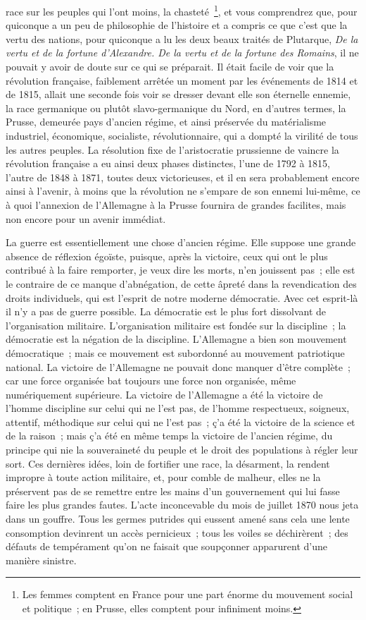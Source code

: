 \documentclass[french,twoside]{book} %
\begin{document}
race sur les peuples qui l’ont moins, la chasteté \footnote{Les femmes comptent en France pour une part énorme du mouvement social et politique ; en Prusse, elles comptent pour infiniment moins.}, et vous comprendrez que, pour quiconque a un peu de philosophie de l’histoire et a compris ce que c’est que la vertu des nations, pour quiconque a lu les deux beaux traités de Plutarque, {\itshape De la vertu et de la fortune d’Alexandre. De la vertu et de la fortune des Romains}, il ne pouvait y avoir de doute sur ce qui se préparait. Il était facile de voir que la révolution française, faiblement arrêtée un moment par les événements de 1814 et de 1815, allait une seconde fois voir se dresser devant elle son éternelle ennemie, la race germanique ou plutôt slavo-germanique du Nord, en d’autres termes, la Prusse, demeurée pays d’ancien régime, et ainsi préservée du matérialisme industriel, économique, socialiste, révolutionnaire, qui a dompté la virilité de tous les autres peuples. La résolution fixe de l’aristocratie prussienne de vaincre la révolution française a eu ainsi deux phases distinctes, l’une de 1792 à 1815, l’autre de 1848 à 1871, toutes deux victorieuses, et il en sera probablement encore ainsi à l’avenir, à moins que la révolution ne s’empare de son ennemi lui-même, ce à quoi l’annexion de l’Allemagne à la Prusse fournira de grandes facilites, mais non encore pour un avenir immédiat.\par
La guerre est essentiellement une chose d’ancien régime. Elle suppose une grande absence de réflexion égoïste, puisque, après la victoire, ceux qui ont le plus contribué à la faire remporter, je veux dire les morts, n’en jouissent pas ; elle est le contraire de ce manque d’abnégation, de cette âpreté dans la revendication des droits individuels, qui est l’esprit de notre moderne démocratie. Avec cet esprit-là il n’y a pas de guerre possible. La démocratie est le plus fort dissolvant de l’organisation militaire. L’organisation militaire est fondée sur la discipline ; la démocratie est la négation de la discipline. L’Allemagne a bien son mouvement démocratique ; mais ce mouvement est subordonné au mouvement patriotique national. La victoire de l’Allemagne ne pouvait donc manquer d’être complète ; car une force organisée bat toujours une force non organisée, même numériquement supérieure. La victoire de l’Allemagne a été la victoire de l’homme discipline sur celui qui ne l’est pas, de l’homme respectueux, soigneux, attentif, méthodique sur celui qui ne l’est pas ; ç’a été la victoire de la science et de la raison ; mais ç’a été en même temps la victoire de l’ancien régime, du principe qui nie la souveraineté du peuple et le droit des populations à régler leur sort. Ces dernières idées, loin de fortifier une race, la désarment, la rendent impropre à toute action militaire, et, pour comble de malheur, elles ne la préservent pas de se remettre entre les mains d’un gouvernement qui lui fasse faire les plus grandes fautes. L’acte inconcevable du mois de juillet 1870 nous jeta dans un gouffre. Tous les germes putrides qui eussent amené sans cela une lente consomption devinrent un accès pernicieux ; tous les voiles se déchirèrent ; des défauts de tempérament qu’on ne faisait que soupçonner apparurent d’une manière sinistre.\par
\end{document}
